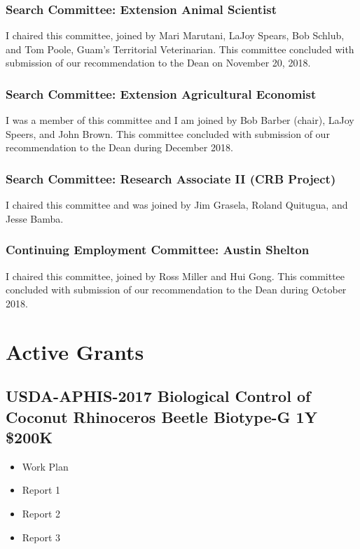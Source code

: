 \subsubsection{Search Committee: Extension Animal Scientist}

I chaired this committee, joined by Mari Marutani, LaJoy Spears,
Bob Schlub, and Tom Poole, Guam's Territorial Veterinarian. This committee concluded with submission of our recommendation to the Dean on November 20, 2018.

\subsubsection{Search Committee: Extension Agricultural Economist}

I was a member of this committee and I am joined by Bob Barber (chair),
LaJoy Speers, and John Brown. This committee concluded with submission of our recommendation to the Dean during December 2018.

\subsubsection{Search Committee: Research Associate II (CRB Project)}

I chaired this committee and was joined by Jim Grasela, Roland Quitugua,
and Jesse Bamba.

\subsubsection{Continuing Employment Committee: Austin Shelton}

I chaired this committee, joined by Ross Miller and Hui Gong. This committee concluded with submission of our recommendation to the Dean during October 2018. 

\clearpage

\appendix

\section{Active Grants}
	
\subsection{USDA-APHIS-2017 Biological Control of Coconut Rhinoceros Beetle Biotype-G 1Y \$200K}
\label{USDA-APHIS-2017}
\begin{refsection}
	\begin{itemize}
		\item Work Plan \cite{moore_fy17_2018} 
		\item Report 1 \cite{moore_usda_2018} 
		\item Report 2 \cite{moore_usda_2018-1} 
		\item Report 3 \cite{moore_usda_2019}		
	\end{itemize}
	\printbibliography[heading=none]
\end{refsection}

